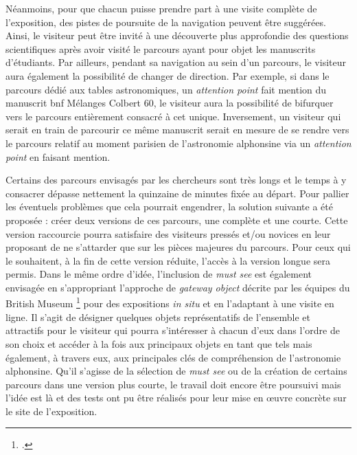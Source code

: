     Néanmoins, pour que chacun puisse prendre part à une visite complète de l’exposition, des pistes de poursuite de la navigation peuvent être suggérées. Ainsi, le visiteur peut être invité à une découverte plus approfondie des questions scientifiques après avoir visité le parcours ayant pour objet les manuscrits d’étudiants. Par ailleurs, pendant sa navigation au sein d’un parcours, le visiteur aura également la possibilité de changer de direction. Par exemple, si dans le parcours dédié aux tables astronomiques, un \textit{attention point} fait mention du manuscrit \acrshort{bnf} Mélanges Colbert 60, le visiteur aura la possibilité de bifurquer vers le parcours entièrement consacré à cet unique. Inversement, un visiteur qui serait en train de parcourir ce même manuscrit serait en mesure de se rendre vers le parcours relatif au moment parisien de l’astronomie alphonsine via un \textit{attention point} en faisant mention. 
    
    Certains des parcours envisagés par les chercheurs sont très longs et le temps à y consacrer dépasse nettement la quinzaine de minutes fixée au départ. Pour pallier les éventuels problèmes que cela pourrait engendrer, la solution suivante a été proposée : créer deux versions de ces parcours, une complète et une courte. Cette version raccourcie pourra satisfaire des visiteurs pressés et/ou novices en leur proposant de ne s’attarder que sur les pièces majeures du parcours. Pour ceux qui le souhaitent, à la fin de cette version réduite, l’accès à la version longue sera permis. Dans le même ordre d’idée, l’inclusion de \textit{must see} est également envisagée en s’appropriant l’approche de \textit{gateway object} décrite par les équipes du British Museum \footnote{\cite{battyObjectFocusedText2016}.} pour des expositions \textit{in situ} et en l’adaptant à une visite en ligne.  Il s’agit de désigner quelques objets représentatifs de l’ensemble et attractifs pour le visiteur qui pourra s’intéresser à chacun d’eux dans l’ordre de son choix et accéder à la fois aux principaux objets en tant que tels mais également, à travers eux, aux principales clés de compréhension de l’astronomie alphonsine. Qu’il s’agisse de la sélection de \textit{must see} ou de la création de certains parcours dans une version plus courte, le travail doit encore être poursuivi mais l’idée est là et des tests ont pu être réalisés pour leur mise en œuvre concrète sur le site de l’exposition. 
    
